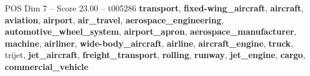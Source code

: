 \begin{textsample}{POS Dim 7 – Score 23.00 – t005286}  \label{ex:f7_pos_012}
\textbf{transport}, \textbf{fixed-wing\_aircraft}, \textbf{aircraft}, \textbf{aviation}, \textbf{airport}, \textbf{air\_travel}, \textbf{aerospace\_engineering}, \textbf{automotive\_wheel\_system}, \textbf{airport\_apron}, \textbf{aerospace\_manufacturer}, \textbf{machine}, \textbf{airliner}, \textbf{wide-body\_aircraft}, \textbf{airline}, \textbf{aircraft\_engine}, \textbf{truck}, trijet, \textbf{jet\_aircraft}, \textbf{freight\_transport}, \textbf{rolling}, \textbf{runway}, \textbf{jet\_engine}, \textbf{cargo}, \textbf{commercial\_vehicle}

\end{textsample}
